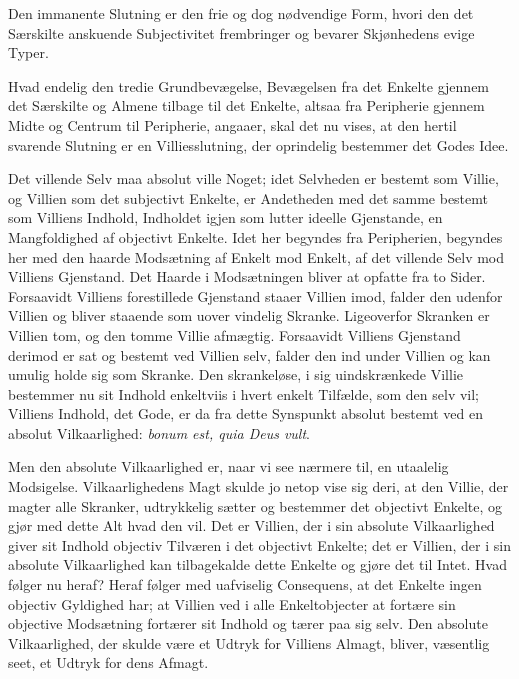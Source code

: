 \documentclass[12pt]{book}
\newcommand{\opage}[1]{\marginnote{\footnotesize\textit{[#1]}}}
\begin{document}
Den immanente Slutning er den frie og dog nødvendige Form, hvori den det Særskilte anskuende Subjectivitet frembringer og bevarer Skjønhedens evige Typer.

Hvad endelig den tredie Grundbevægelse, Bevægelsen fra det Enkelte gjennem det Særskilte og Almene tilbage til det Enkelte, altsaa fra Peripherie gjennem Midte og Centrum til Peripherie, angaaer, skal det nu vises, at den hertil svarende Slutning er en Villiesslutning, der oprindelig bestemmer det Godes Idee.

Det villende Selv maa absolut ville Noget; idet Selvheden er bestemt som Villie, og Villien som det subjectivt Enkelte, er Andetheden med det samme bestemt som Villiens Indhold, Indholdet igjen som lutter ideelle Gjenstande, en Mangfoldighed af objectivt Enkelte. Idet her begyndes fra Peripherien, begyndes her med den haarde Modsætning af Enkelt mod Enkelt, af det villende Selv mod Villiens Gjenstand. Det Haarde i Modsætningen bliver at opfatte fra to Sider. Forsaavidt Villiens forestillede Gjenstand staaer Villien imod, falder den udenfor Villien og bliver staaende som uover%
\opage{381}vindelig Skranke. Ligeoverfor Skranken er Villien tom, og den tomme Villie afmægtig. Forsaavidt Villiens Gjenstand derimod er sat og bestemt ved Villien selv, falder den ind under Villien og kan umulig holde sig som Skranke. Den skrankeløse, i sig uindskrænkede Villie bestemmer nu sit Indhold enkeltviis i hvert enkelt Tilfælde, som den selv vil; Villiens Indhold, det Gode, er da fra dette Synspunkt absolut bestemt ved en absolut Vilkaarlighed: \textit{bonum est, quia Deus vult}.

Men den absolute Vilkaarlighed er, naar vi see nærmere til, en utaalelig Modsigelse. Vilkaarlighedens Magt skulde jo netop vise sig deri, at den Villie, der magter alle Skranker, udtrykkelig sætter og bestemmer det objectivt Enkelte, og gjør med dette Alt hvad den vil. Det er Villien, der i sin absolute Vilkaarlighed giver sit Indhold objectiv Tilværen i det objectivt Enkelte; det er Villien, der i sin absolute Vilkaarlighed kan tilbagekalde dette Enkelte og gjøre det til Intet. Hvad følger nu heraf? Heraf følger med uafviselig Consequens, at det Enkelte ingen objectiv Gyldighed har; at Villien ved i alle Enkeltobjecter at fortære sin objective Modsætning fortærer sit Indhold og tærer paa sig selv. Den absolute Vilkaarlighed, der skulde være et Udtryk for Villiens Almagt, bliver, væsentlig seet, et Udtryk for dens Afmagt.
\end{document}
